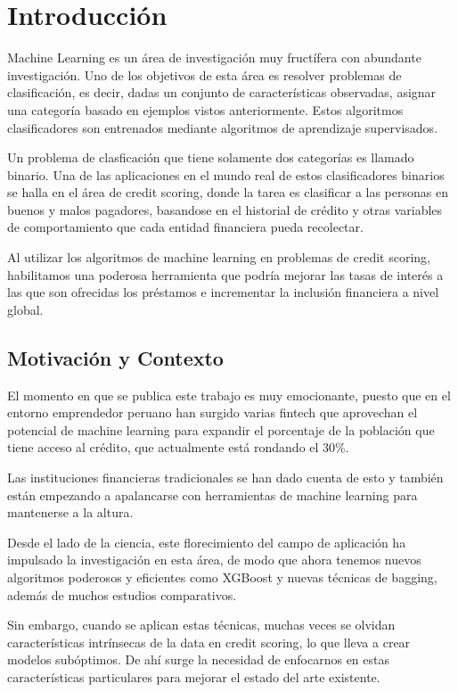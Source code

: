 \chapter{Introducción}

Machine Learning es un área de investigación muy fructífera con abundante investigación. Uno de los objetivos de esta área es resolver problemas de clasificación, es decir, dadas un conjunto de características observadas, asignar una categoría basado en ejemplos vistos anteriormente. Estos algoritmos clasificadores son entrenados mediante algoritmos de aprendizaje supervisados.

Un problema de clasficación que tiene solamente dos categorías es llamado binario. Una de las aplicaciones en el mundo real de estos clasificadores binarios se halla en el área de credit scoring, donde la tarea es clasificar a las personas en buenos y malos pagadores, basandose en el historial de crédito y otras variables de comportamiento que cada entidad financiera pueda recolectar.

Al utilizar los algoritmos de machine learning en problemas de credit scoring, habilitamos una poderosa herramienta que podría mejorar las tasas de interés a las que son ofrecidas los préstamos e incrementar la inclusión financiera a nivel global.

\section{Motivación y Contexto}

El momento en que se publica este trabajo es muy emocionante, puesto que en el entorno emprendedor peruano han surgido varias fintech que aprovechan el potencial de machine learning para expandir el porcentaje de la población que tiene acceso al crédito, que actualmente está rondando el 30\%.

Las instituciones financieras tradicionales se han dado cuenta de esto y también están empezando a apalancarse con herramientas de machine learning para mantenerse a la altura.

Desde el lado de la ciencia, este florecimiento del campo de aplicación ha impulsado la investigación en esta área, de modo que ahora tenemos nuevos algoritmos poderosos y eficientes como \ac{XGBoost} y nuevas técnicas de bagging, además de muchos estudios comparativos.

Sin embargo, cuando se aplican estas técnicas, muchas veces se olvidan características intrínsecas de la data en credit scoring, lo que lleva a crear modelos subóptimos. De ahí surge la necesidad de enfocarnos en estas características particulares para mejorar el estado del arte existente.

